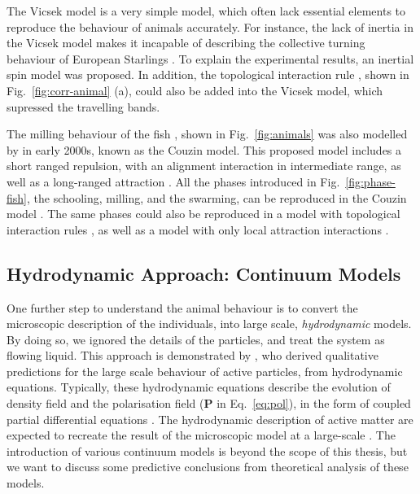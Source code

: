 \documentclass[11pt,twoside]{report}
\begin{document}
The Vicsek model is a very simple model, which often lack essential elements to reproduce the behaviour of animals accurately. For instance, the lack of inertia in the Vicsek model makes it incapable of describing the collective turning behaviour of European Starlings \cite{attanasi2014np}. To explain the experimental results, an inertial spin model \cite{attanasi2014np, cavagna2015} was proposed. In addition, the topological interaction rule \cite{ballerini2008pnas}, shown in Fig.~\ref{fig:corr-animal} (a), could also be added into the Vicsek model,  which supressed the travelling bands.


The milling behaviour of the fish \cite{tunstrom2013}, shown in Fig.~\ref{fig:animals} was also modelled by \citeauthor{couzin2002} in early 2000s, known as the Couzin model. This proposed model includes a short ranged repulsion, with an alignment interaction in intermediate range, as well as a long-ranged attraction \cite{couzin2002}. All the phases introduced in Fig.~\ref{fig:phase-fish}, the schooling, milling, and the swarming, can be reproduced in the Couzin model \cite{tunstrom2013}. The same phases could also be reproduced in a model with topological interaction rules \cite{gautrais2012, calovi2014}, as well as a model with only local attraction interactions \cite{strombom2011}.




\subsection{Hydrodynamic Approach: Continuum Models}

One further step to understand the animal behaviour is to convert the microscopic description of the individuals, into large scale, \emph{hydrodynamic} models. By doing so, we ignored the details of the particles, and treat the system as flowing liquid.
This approach is demonstrated by \citeauthor{toner1995}, who derived qualitative predictions for the large scale behaviour of active particles, from hydrodynamic equations.
Typically, these hydrodynamic equations describe the evolution of density field and the polarisation field ($\mathbf{P}$ in Eq.~\ref{eq:pol}), in the form of coupled partial differential equations \cite{toner1995, toner1998, shaebani2019}.
The hydrodynamic description of active matter are expected to recreate the result of the microscopic model at a large-scale \cite{mahault2019}.
The introduction of various continuum models is beyond the scope of this thesis, but we want to discuss some predictive conclusions from theoretical analysis of these models.
\end{document}
